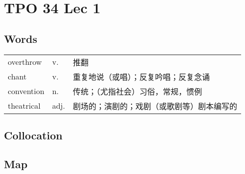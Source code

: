\section{TPO 34 Lec 1}

\subsection{Words}

\begin{tabular}{lll}
    overthrow  & v.   & 推翻                    \\
    chant      & v.   & 重复地说（或唱）；反复吟唱；反复念诵    \\
    convention & n.   & 传统；（尤指社会）习俗，常规，惯例     \\
    theatrical & adj. & 剧场的；演剧的；戏剧（或歌剧等）剧本编写的 \\
\end{tabular}

\subsection{Collocation}

\subsection{Map}
